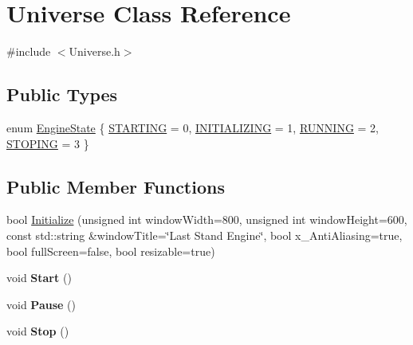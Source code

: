 \hypertarget{classUniverse}{}\section{Universe Class Reference}
\label{classUniverse}


{\ttfamily \#include $<$Universe.\+h$>$}

\subsection*{Public Types}
\begin{DoxyCompactItemize}
\item 
enum \hyperlink{classUniverse_a9a3907e0a49d7e91098163238ef50505}{Engine\+State} \{ \hyperlink{classUniverse_a9a3907e0a49d7e91098163238ef50505a2ccf20ffb4fe4beb8d5f01e138ad4e72}{S\+T\+A\+R\+T\+I\+N\+G} = 0, 
\hyperlink{classUniverse_a9a3907e0a49d7e91098163238ef50505ae8454679e33e08f1a27b6cf469155c3a}{I\+N\+I\+T\+I\+A\+L\+I\+Z\+I\+N\+G} = 1, 
\hyperlink{classUniverse_a9a3907e0a49d7e91098163238ef50505a291f8ef62e9f213687e37c52a41b49b5}{R\+U\+N\+N\+I\+N\+G} = 2, 
\hyperlink{classUniverse_a9a3907e0a49d7e91098163238ef50505a09af4dbe08a6b4c30e16ca60dc814f03}{S\+T\+O\+P\+I\+N\+G} = 3
 \}
\end{DoxyCompactItemize}
\subsection*{Public Member Functions}
\begin{DoxyCompactItemize}
\item 
bool \hyperlink{classUniverse_a3860ac71f57025031201a3ae5c110f1d}{Initialize} (unsigned int window\+Width=800, unsigned int window\+Height=600, const std\+::string \&window\+Title=\char`\"{}Last Stand Engine\char`\"{}, bool x\+\_\+\+Anti\+Aliasing=true, bool full\+Screen=false, bool resizable=true)
\item 
\hypertarget{classUniverse_a8789e78de0e3b22175a853afc38596e6}{}void {\bfseries Start} ()\label{classUniverse_a8789e78de0e3b22175a853afc38596e6}

\item 
\hypertarget{classUniverse_ac0d229ce70112bbbf760f5ca0864aa9d}{}void {\bfseries Pause} ()\label{classUniverse_ac0d229ce70112bbbf760f5ca0864aa9d}

\item 
\hypertarget{classUniverse_ae38c939451fc5eea5b33cd5ff4c4ce8e}{}void {\bfseries Stop} ()\label{classUniverse_ae38c939451fc5eea5b33cd5ff4c4ce8e}

\end{DoxyCompactItemize}
